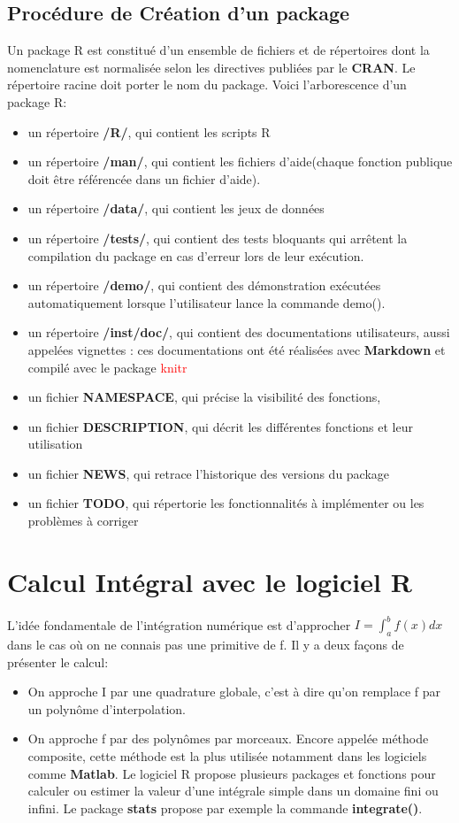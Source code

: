 \documentclass[12pt,a4paper]{scrbook}
\begin{document}
			\subsection{Procédure de Création d'un package}
Un package R est constitué d'un ensemble de fichiers et de répertoires dont la nomenclature est normalisée selon les directives publiées par le \textbf{CRAN}. Le répertoire racine doit porter le nom du package. Voici l'arborescence d'un package R:
			\begin{itemize}
				\item un répertoire \textbf{/R/}, qui contient les scripts R
				\item un répertoire \textbf{/man/}, qui contient les fichiers d'aide(chaque fonction publique doit être référencée dans un fichier d'aide).
				\item un répertoire \textbf{/data/}, qui contient les jeux de données 
				\item un répertoire \textbf{/tests/}, qui contient des tests bloquants qui arrêtent la compilation du package en cas d'erreur lors de leur exécution.
				\item un répertoire \textbf{/demo/}, qui contient des démonstration exécutées automatiquement lorsque l'utilisateur lance la commande demo().
				\item un répertoire \textbf{/inst/doc/}, qui contient des documentations utilisateurs, aussi appelées vignettes : ces documentations ont été réalisées avec \textbf{Markdown} et compilé avec le package \textcolor{red}{knitr} 
				\item un fichier \textbf{NAMESPACE}, qui précise la visibilité des fonctions,
				\item un fichier \textbf{DESCRIPTION}, qui décrit les différentes fonctions et leur utilisation
				\item un fichier \textbf{NEWS}, qui retrace l'historique des versions du package
				\item un fichier \textbf{TODO}, qui répertorie les fonctionnalités à implémenter ou les problèmes à corriger
			\end{itemize}
		\section{Calcul Intégral avec le logiciel R}
L'idée fondamentale de l'intégration numérique est d'approcher $I=\int_a^b f(x) dx$ dans le cas où on ne connais pas une primitive de f. Il y a deux façons de présenter le calcul:
\begin{itemize}
\item On approche I par une quadrature globale, c'est à dire qu'on remplace f par un polynôme d'interpolation.
\item On approche f par des polynômes par morceaux. Encore appelée méthode composite, cette méthode est la plus utilisée notamment dans les logiciels comme \textbf{Matlab}. Le logiciel R propose plusieurs packages et fonctions pour calculer ou estimer la valeur d'une intégrale simple dans un domaine fini ou infini. Le package \textbf{stats} propose par exemple la commande \textbf{integrate()}.
\end{itemize}
\end{document}
